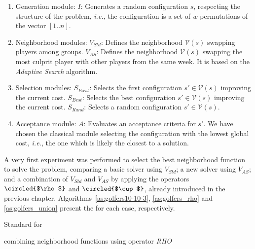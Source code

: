 \begin{enumerate}
	\item Generation module:
	\subitem $I$: Generates a random configuration $s$, respecting the structure of the problem, {\it i.e.}, the configuration is a set of $w$ permutations of the vector $[1..n]$. 
	\item Neighborhood modules:
	\subitem $V_{Std}$: Defines the neighborhood $\mathcal{V}\left(s\right)$ swapping players among groups.
	\subitem $V_{AS}$: Defines the neighborhood $\mathcal{V}\left(s\right)$ swapping the most culprit player with other players from the same week. It is based on the {\it Adaptive Search} algorithm.
	\item Selection modules:
	\subitem $S_{First}$: Selects the first configuration $s' \in \mathcal{V}\left(s\right)$ improving the current cost.
	\subitem $S_{Best}$: Selects the best configuration $s' \in \mathcal{V}\left(s\right)$ improving the current cost.
	\subitem $S_{Rand}$: Selects a random configuration $s' \in \mathcal{V}\left(s\right)$.
	\item Acceptance module:
	\subitem $A$: Evaluates an acceptance criteria for $s'$. We have chosen the classical module selecting the configuration with the lowest global cost, {\it i.e.}, the one which is likely the closest to a solution.
\end{enumerate}

A very first experiment was performed to select the best neighborhood function to solve the problem, comparing a basic solver using $V_{Std}$; a new solver using $V_{AS}$; and a combination of $V_{Std}$ and $V_{AS}$ by applying the operators $\circled{$\rho$}$ and $\circled{$\cup$}$, already introduced in the previous chapter. Algorithms~\ref{as:golfers10-10-3}, \ref{as:golfers_rho} and \ref{as:golfers_union} present the \as{} for each case, respectively.

\begin{algorithm}[H]
\dontprintsemicolon
\SetNoline
{}
\caption{Standard \as{} for \SGP}\label{as:golfers10-10-3}
\end{algorithm}

\begin{algorithm}[H]
\dontprintsemicolon
\SetNoline
{}
\caption{\As{} combining neighborhood functions using operator {\it RHO}}\label{as:golfers_rho}
\end{algorithm}

